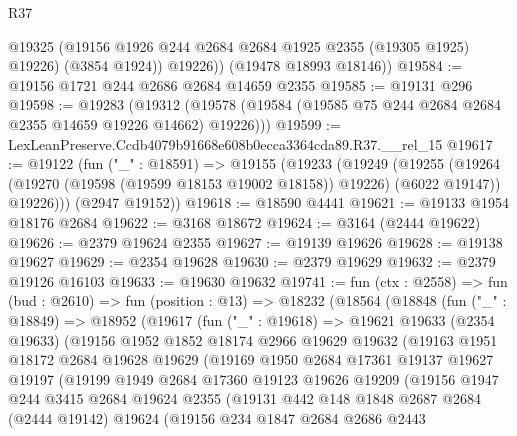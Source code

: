 \begin{lexlean}{R37}
\begin{coremodule}
            @19325
            (@19156 @1926 @244 @2684 @2684 @1925 @2355 (@19305 @1925) @19226)
            (@3854 @1924))
          @19226))
      (@19478 @18993 @18146))
@19584 := @19156 @1721 @244 @2686 @2684 @14659 @2355
@19585 := @19131 @296
@19598 := @19283
    (@19312 (@19578 (@19584 (@19585 @75 @244 @2684 @2684 @2355 @14659 @19226 @14662) @19226)))
@19599 := LexLeanPreserve.Ccdb4079b91668e608b0ecca3364cda89.R37.__rel_15
@19617 := @19122
    (fun ("_" : @18591) =>
    @19155
      (@19233
        (@19249
          (@19255
            (@19264 (@19270 (@19598 (@19599 @18153 @19002 @18158)) @19226) (@6022 @19147))
            @19226)))
      (@2947 @19152))
@19618 := @18590 @4441
@19621 := @19133 @1954 @18176 @2684
@19622 := @3168 @18672
@19624 := @3164 (@2444 @19622)
@19626 := @2379 @19624 @2355
@19627 := @19139 @19626
@19628 := @19138 @19627
@19629 := @2354 @19628
@19630 := @2379 @19629
@19632 := @2379 @19126 @16103
@19633 := @19630 @19632
@19741 := fun (ctx : @2558) =>
  fun (bud : @2610) =>
  fun (position : @13) =>
  @18232
    (@18564
      (@18848
        (fun ("_" : @18849) =>
        @18952
          (@19617
            (fun ("_" : @19618) =>
            @19621
              @19633
              (@2354 @19633)
              (@19156
                @1952
                @1852
                @18174
                @2966
                @19629
                @19632
                (@19163
                  @1951
                  @18172
                  @2684
                  @19628
                  @19629
                  (@19169
                    @1950
                    @2684
                    @17361
                    @19137
                    @19627
                    @19197
                    (@19199
                      @1949
                      @2684
                      @17360
                      @19123
                      @19626
                      @19209
                      (@19156
                        @1947
                        @244
                        @3415
                        @2684
                        @19624
                        @2355
                        (@19131
                          @442
                          @148
                          @1848
                          @2687
                          @2684
                          (@2444 @19142)
                          @19624
                          (@19156
                            @234
                            @1847
                            @2684
                            @2686
                            @2443

\end{coremodule}
\end{lexlean}
